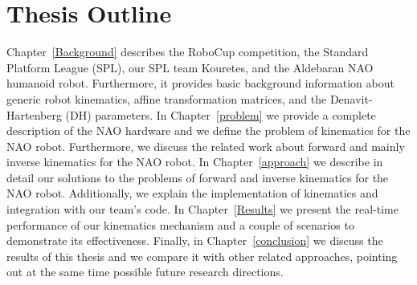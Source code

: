 \section{Thesis Outline}
Chapter~\ref{Background} describes the RoboCup competition, the Standard Platform League (SPL), our SPL team Kouretes, and the Aldebaran NAO humanoid robot. Furthermore, it provides basic background information about  generic robot kinematics, affine transformation matrices, and the Denavit-Hartenberg (DH) parameters. In Chapter~\ref{problem} we provide a complete description of the NAO hardware and we define the problem of kinematics for the NAO robot. 
Furthermore, 
we discuss the related work about forward and mainly inverse kinematics for the NAO robot. In Chapter~\ref{approach} we describe in detail our solutions to the problems of forward and inverse kinematics for the NAO robot. Additionally, we explain the implementation of kinematics and integration with our team's code. In Chapter~\ref{Results} we present the real-time performance of our kinematics mechanism and a couple of scenarios to demonstrate its effectiveness. Finally, in Chapter~\ref{conclusion} we discuss the results of this thesis and we compare it with other related approaches, pointing out at the same time possible future research directions.


